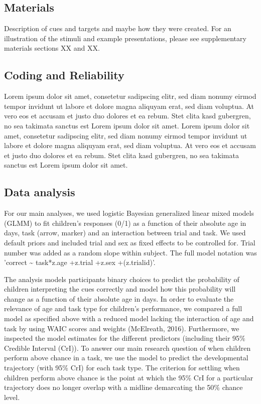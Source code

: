 \documentclass[
  man]{apa6}
\begin{document}
\subsection{Materials}\label{materials}

Description of cues and targets and maybe how they were created. For an illustration of the stimuli and example presentations, please see supplementary materials sections XX and XX.

\subsection{Coding and Reliability}\label{coding-and-reliability}

Lorem ipsum dolor sit amet, consetetur sadipscing elitr, sed diam nonumy eirmod tempor invidunt ut labore et dolore magna aliquyam erat, sed diam voluptua. At vero eos et accusam et justo duo dolores et ea rebum. Stet clita kasd gubergren, no sea takimata sanctus est Lorem ipsum dolor sit amet. Lorem ipsum dolor sit amet, consetetur sadipscing elitr, sed diam nonumy eirmod tempor invidunt ut labore et dolore magna aliquyam erat, sed diam voluptua. At vero eos et accusam et justo duo dolores et ea rebum. Stet clita kasd gubergren, no sea takimata sanctus est Lorem ipsum dolor sit amet.

\subsection{Data analysis}\label{data-analysis}

For our main analyses, we used logistic Bayesian generalized linear mixed models (GLMM) to fit children's responses (0/1) as a function of their absolute age in days, task (arrow, marker) and an interaction between trial and task. We used default priors and included trial and sex as fixed effects to be controlled for. Trial number was added as a random slope within subject. The full model notation was 'correct \textasciitilde{} task*z.age +z.trial +z.sex +(z.trial\textbar id)'.

The analysis models participants binary choices to predict the probability of children interpreting the cues correctly and model how this probability will change as a function of their absolute age in days. In order to evaluate the relevance of age and task type for children's performance, we compared a full model as specified above with a reduced model lacking the interaction of age and task by using WAIC scores and weights (McElreath, 2016). Furthermore, we inspected the model estimates for the different predictors (including their 95\% Credible Interval (CrI)). To answer our main research question of when children perform above chance in a task, we use the model to predict the developmental trajectory (with 95\% CrI) for each task type. The criterion for settling when children perform above chance is the point at which the 95\% CrI for a particular trajectory does no longer overlap with a midline demarcating the 50\% chance level.
\end{document}

